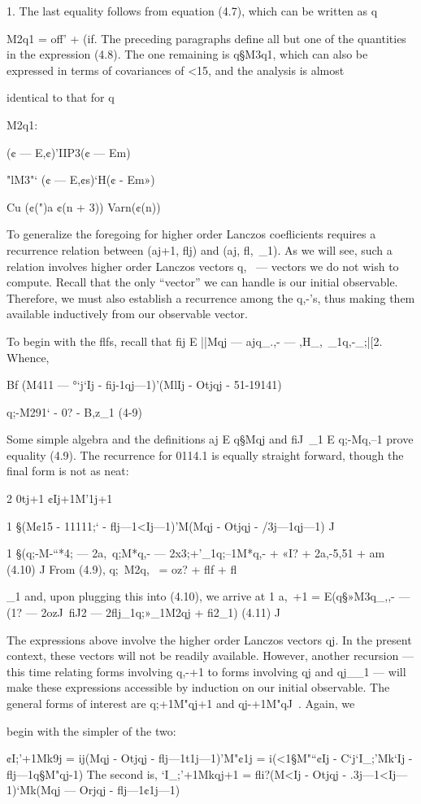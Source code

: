 1.
The last equality follows from equation (4.7), which can be written as q{M2q1 = off’ + (if. The
preceding paragraphs deﬁne all but one of the quantities in the expression (4.8). The one remaining
is q§M3q1, which can also be expressed in terms of covariances of <15, and the analysis is almost

identical to that for q{M2q1:

(¢ — E,¢)'IIP3(¢ — Em)

"lM3"‘ (¢ — E,¢s)‘H(¢ - Em»)

Cu (¢(")a ¢(n + 3))
Varn(¢(n))

To generalize the foregoing for higher order Lanczos coeﬂicients requires a recurrence
relation between (aj+1, ﬂj) and (aj, ﬂ,~_1). As we will see, such a relation involves higher order
Lanczos vectors q,~ — vectors we do not wish to compute. Recall that the only “vector” we can
handle is our initial observable. Therefore, we must also establish a recurrence among the q,-’s, thus
making them available inductively from our observable vector.

To begin with the ﬂfs, recall that ﬁj E ||Mqj — ajq_.,- — ,H_,~_1q,-_;|[2. Whence,

Bf (M411 — °‘j‘Ij - ﬁj-1qj—1)’(MlIj - Otjqj - 51-19141)

q;-M291‘ - 0? - B,z_1 (4-9)

Some simple algebra and the deﬁnitions aj E q§Mqj and ﬁJ~_1 E q;-Mq,--1 prove equality (4.9). The
recurrence for 0114.1 is equally straight forward, though the ﬁnal form is not as neat:

2
0tj+1 ¢Ij+1M'1j+1

1
§(M¢15 - 11111;‘ - ﬂj—1<Ij—1)'M(Mqj - Otjqj - /3j—1qj—1)
J

1
§(q;-M-“*4; — 2a,~q;M*q,- — 2x3;+’_1q;--1M*q,- + «I? + 2a,-5,51 + am (4.10)
J
From (4.9), q;~M2q,~ = oz? + ﬂf + ﬂ}_1 and, upon plugging this into (4.10), we arrive at
1
a,~+1 = E(q§»M3q_,,- — (1? — 2ozJ~ﬁJ2 — 2ﬂj_1q;»_1M2qj + ﬁ2_1) (4.11)
J

The expressions above involve the higher order Lanczos vectors qj. In the present context,
these vectors will not be readily available. However, another recursion — this time relating forms
involving q,-+1 to forms involving qj and qj__1 — will make these expressions accessible by induction
on our initial observable. The general forms of interest are q;+1M"qj+1 and qj-+1M"qJ~. Again, we

begin with the simpler of the two:

¢I;'+1Mk9j = ij(Mqj - Otjqj - ﬂj—1t1j—1)'M"¢1j
= i(<1§M"“¢Ij - C‘j‘I_;'Mk‘Ij - ﬂj—1q§M"qj-1)
The second is,
‘I_;'+1Mkqj+1 = ﬂi?(M<Ij - Otjqj - .3j—1<Ij—1)‘Mk(Mqj — Orjqj - ﬂj—1¢1j—1)

}

